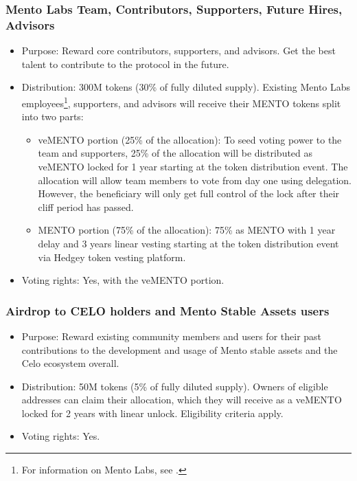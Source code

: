 \documentclass[a4paper]{article}
\theoremstyle{definition}
\begin{document}
\subsubsection*{Mento Labs Team, Contributors, Supporters, Future Hires, Advisors}
\begin{itemize}
    \item Purpose: Reward core contributors, supporters, and advisors. Get the best talent to contribute to the protocol in the future.
    \item Distribution: 300M tokens (30\% of fully diluted supply). Existing Mento Labs employees\footnote{For information on Mento Labs, see \cite{mento_labs_website}.}, supporters, and advisors will receive their MENTO tokens split into two parts:
    \begin{itemize}
        \item veMENTO portion (25\% of the allocation):
        To seed voting power to the team and supporters, 25\% of the allocation will be distributed as veMENTO locked for 1 year starting at the token distribution event. The allocation will allow team members to vote from day one using delegation. However, the beneficiary will only get full control of the lock after their cliff period has passed.
        \item MENTO portion (75\% of the allocation): 75\% as MENTO with 1 year delay and 3 years linear vesting starting at the token distribution event via Hedgey token vesting platform. 
    \end{itemize}
    \item Voting rights: Yes, with the veMENTO portion.
\end{itemize}

\subsubsection*{Airdrop to CELO holders and Mento Stable Assets users}
\begin{itemize}
    \item Purpose: Reward existing community members and users for their past contributions to the development and usage of Mento stable assets and the Celo ecosystem overall. 
    \item Distribution: 50M tokens (5\% of fully diluted supply). Owners of eligible addresses can claim their allocation, which they will receive as a veMENTO locked for 2 years with linear unlock. Eligibility criteria apply.
    \item Voting rights: Yes.
\end{itemize}
\end{document}
